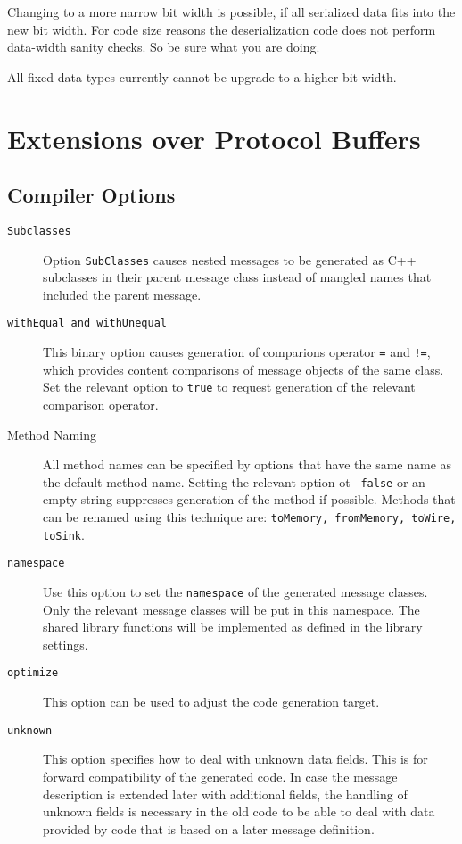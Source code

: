 \documentclass[12pt]{article}
\begin{document}
Changing to a more narrow bit width is possible, if all serialized data fits
into the new bit width. For code size reasons the deserialization code does not
perform data-width sanity checks. So be sure what you are doing.

All fixed data types currently cannot be upgrade to a higher bit-width.

\section{Extensions over Protocol Buffers}
\subsection{Compiler Options}
\begin{description}

	\item [{\tt Subclasses}]
Option {\tt SubClasses} causes nested messages to be generated as C++
subclasses in their parent message class instead of mangled names that included
the parent message.

\item[{\tt withEqual and withUnequal}]
	This binary option causes generation of comparions operator {\tt =} and
		{\tt !=}, which provides content comparisons of message objects
		of the same class. Set the relevant option to {\tt true} to
		request generation of the relevant comparison operator.

\item[Method Naming]
	All method names can be specified by options that have the same name as
		the default method name. Setting the relevant option ot {\tt
		false} or an empty string suppresses generation of the method
		if possible. Methods that can be renamed using this technique
		are: {\tt toMemory, fromMemory, toWire, toSink}.

\item[{\tt namespace}]
	Use this option to set the {\tt namespace} of the generated message
		classes.  Only the relevant message classes will be put in this
		namespace. The shared library functions will be implemented as
		defined in the library settings.

\item[{\tt optimize}]
	This option can be used to adjust the code generation target. 

\item[{\tt unknown}]
	This option specifies how to deal with unknown data fields. This is for
		forward compatibility of the generated code. In case the
		message description is extended later with additional fields,
		the handling of unknown fields is necessary in the old code to
		be able to deal with data provided by code that is based on a
		later message definition.
	

\end{description}
\end{document}
